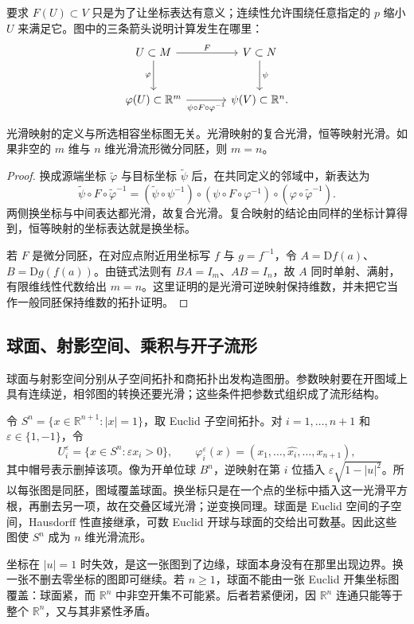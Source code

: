 要求 \(F(U)\subset V\) 只是为了让坐标表达有意义；连续性允许围绕任意指定的 \(p\) 缩小 \(U\) 来满足它。图中的三条箭头说明计算发生在哪里：
\[
	\begin{tikzcd}[column sep=large,row sep=large]
		U\subset M \arrow[r,"F"] \arrow[d,"\varphi"'] & V\subset N \arrow[d,"\psi"] \\
		\varphi(U)\subset\mathbb R^m \arrow[r,"\psi\circ F\circ\varphi^{-1}"'] & \psi(V)\subset\mathbb R^n.
	\end{tikzcd}
\]

\begin{proposition}
	\label{g1:prop:smooth-coordinate-independence}
	光滑映射的定义与所选相容坐标图无关。光滑映射的复合光滑，恒等映射光滑。如果非空的 \(m\) 维与 \(n\) 维光滑流形微分同胚，则 \(m=n\)。
\end{proposition}

\begin{proof}
	换成源端坐标 \(\widetilde\varphi\) 与目标坐标 \(\widetilde\psi\) 后，在共同定义的邻域中，新表达为
	\[
		\widetilde\psi\circ F\circ\widetilde\varphi^{-1}
		=(\widetilde\psi\circ\psi^{-1})\circ(\psi\circ F\circ\varphi^{-1})\circ(\varphi\circ\widetilde\varphi^{-1}).
	\]
	两侧换坐标与中间表达都光滑，故复合光滑。复合映射的结论由同样的坐标计算得到，恒等映射的坐标表达就是换坐标。

	若 \(F\) 是微分同胚，在对应点附近用坐标写 \(f\) 与 \(g=f^{-1}\)，令 \(A=\mathrm{D}f(a)\)、\(B=\mathrm{D}g(f(a))\)。由链式法则有 \(BA=I_m\)、\(AB=I_n\)，故 \(A\) 同时单射、满射，有限维线性代数给出 \(m=n\)。这里证明的是光滑可逆映射保持维数，并未把它当作一般同胚保持维数的拓扑证明。
\end{proof}

\subsection{球面、射影空间、乘积与开子流形}
\label{g1:subsec:1101:02}

球面与射影空间分别从子空间拓扑和商拓扑出发构造图册。参数映射要在开图域上具有连续逆，相邻图的转换还要光滑；这些条件把参数式组织成了流形结构。

\begin{example}
	\label{g1:exm:sphere-smooth-atlas}
	令 \(S^n=\{x\in\mathbb R^{n+1}:|x|=1\}\)，取 Euclid 子空间拓扑。对 \(i=1,\ldots,n+1\) 和 \(\varepsilon\in\{1,-1\}\)，令
	\[
		U_i^\varepsilon=\{x\in S^n:\varepsilon x_i>0\},\qquad
		\varphi_i^\varepsilon(x)=(x_1,\ldots,\widehat{x_i},\ldots,x_{n+1}),
	\]
	其中帽号表示删掉该项。像为开单位球 \(B^n\)，逆映射在第 \(i\) 位插入 \(\varepsilon\sqrt{1-|u|^2}\)。所以每张图是同胚，图域覆盖球面。换坐标只是在一个点的坐标中插入这一光滑平方根，再删去另一项，故在交叠区域光滑；逆变换同理。球面是 Euclid 空间的子空间，Hausdorff 性直接继承，可数 Euclid 开球与球面的交给出可数基。因此这些图使 \(S^n\) 成为 \(n\) 维光滑流形。

	坐标在 \(|u|=1\) 时失效，是这一张图到了边缘，球面本身没有在那里出现边界。换一张不删去零坐标的图即可继续。若 \(n\geq1\)，球面不能由一张 Euclid 开集坐标图覆盖：球面紧，而 \(\mathbb R^n\) 中非空开集不可能紧。后者若紧便闭，因 \(\mathbb R^n\) 连通只能等于整个 \(\mathbb R^n\)，又与其非紧性矛盾。
\end{example}

